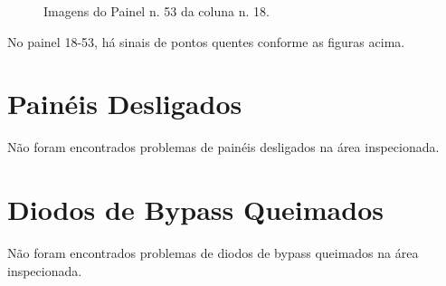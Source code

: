 \documentclass[dvipsnames]{article}%
\begin{document}
\begin{figure}[h!]%
\centering%
%
\hfill%
%
\hfill%
%
\caption{Imagens do Painel n. 53 da coluna n. 18.}%
\end{figure}

%
\FloatBarrier%
No painel 18{-}53, há sinais de pontos quentes conforme as figuras acima.\newline%
%
\newpage%
\section{Painéis Desligados}%
Não foram encontrados problemas de painéis desligados na área inspecionada.\newline%
%
\newpage%
\section{Diodos de Bypass Queimados}%
Não foram encontrados problemas de diodos de bypass queimados na área inspecionada.\newline%
%
\end{document}

